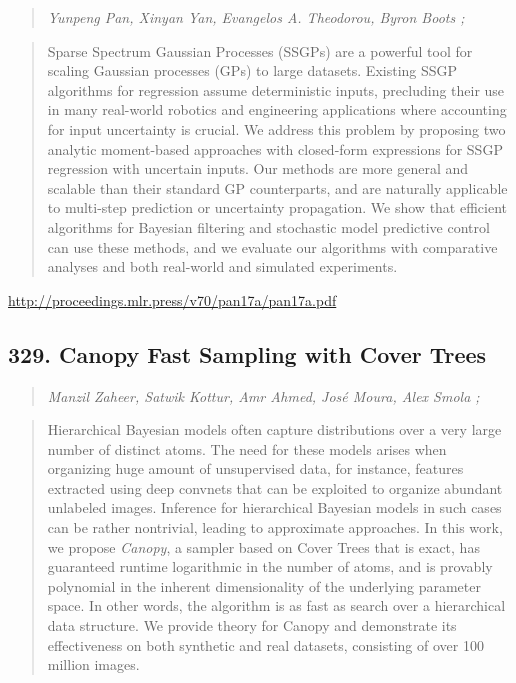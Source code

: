 \documentclass{article}
\begin{document}
\begin{quote}
\footnotesize{\textit{Yunpeng Pan, Xinyan Yan, Evangelos A. Theodorou, Byron Boots ;}}

\end{quote}

\begin{quote}
    Sparse Spectrum Gaussian Processes (SSGPs) are a powerful tool for scaling Gaussian processes (GPs) to large datasets. Existing SSGP algorithms for regression assume deterministic inputs, precluding their use in many real-world robotics and engineering applications where accounting for input uncertainty is crucial. We address this problem by proposing two analytic moment-based approaches with closed-form expressions for SSGP regression with uncertain inputs. Our methods are more general and scalable than their standard GP counterparts, and are naturally applicable to multi-step prediction or uncertainty propagation. We show that efficient algorithms for Bayesian filtering and stochastic model predictive control can use these methods, and we evaluate our algorithms with comparative analyses and both real-world and simulated experiments.  
\end{quote}

\href{http://proceedings.mlr.press/v70/pan17a/pan17a.pdf}{http://proceedings.mlr.press/v70/pan17a/pan17a.pdf}

\subsection{329. Canopy  Fast Sampling with Cover Trees}

\begin{quote}
\footnotesize{\textit{Manzil Zaheer, Satwik Kottur, Amr Ahmed, José Moura, Alex Smola ;}}

\end{quote}

\begin{quote}
    Hierarchical Bayesian models often capture distributions over a very large number of distinct atoms. The need for these models arises when organizing huge amount of unsupervised data, for instance, features extracted using deep convnets that can be exploited to organize abundant unlabeled images. Inference for hierarchical Bayesian models in such cases can be rather nontrivial, leading to approximate approaches. In this work, we propose \textit{Canopy}, a sampler based on Cover Trees that is exact, has guaranteed runtime logarithmic in the number of atoms, and is provably polynomial in the inherent dimensionality of the underlying parameter space. In other words, the algorithm is as fast as search over a hierarchical data structure. We provide theory for Canopy and demonstrate its effectiveness on both synthetic and real datasets, consisting of over 100 million images.  
\end{quote}
\end{document}
